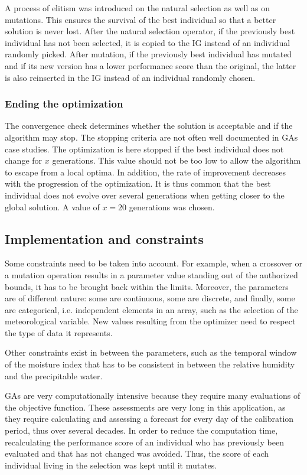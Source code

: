 \documentclass{ametsoc}
\begin{document}
A process of elitism was introduced on the natural selection as well as on mutations. This ensures the survival of the best individual so that a better solution is never lost. After the natural selection operator, if the previously best individual has not been selected, it is copied to the IG instead of an individual randomly picked. After mutation, if the previously best individual has mutated and if its new version has a lower performance score than the original, the latter is also reinserted in the IG instead of an individual randomly chosen.


\subsubsection{Ending the optimization}

The convergence check determines whether the solution is acceptable and if the algorithm may stop. The stopping criteria are not often well documented in GAs case studies. The optimization is here stopped if the best individual does not change for $x$ generations. This value should not be too low to allow the algorithm to escape from a local optima. In addition, the rate of improvement decreases with the progression of the optimization. It is thus common that the best individual does not evolve over several generations when getting closer to the global solution. A value of $x=20$ generations was chosen.


\subsection{Implementation and constraints}

Some constraints need to be taken into account. For example, when a crossover or a mutation operation results in a parameter value standing out of the authorized bounds, it has to be brought back within the limits. Moreover, the parameters are of different nature: some are continuous, some are discrete, and finally, some are categorical, i.e. independent elements in an array, such as the selection of the meteorological variable. New values resulting from the optimizer need to respect the type of data it represents.

Other constraints exist in between the parameters, such as the temporal window of the moisture index \cite[see][]{Horton2016} that has to be consistent in between the relative humidity and the precipitable water.

GAs are very computationally intensive because they require many evaluations of the objective function. These assessments are very long in this application, as they require calculating and assessing a forecast for every day of the calibration period, thus over several decades. In order to reduce the computation time, recalculating the performance score of an individual who has previously been evaluated and that has not changed was avoided. Thus, the score of each individual living in the selection was kept until it mutates.
\end{document}
